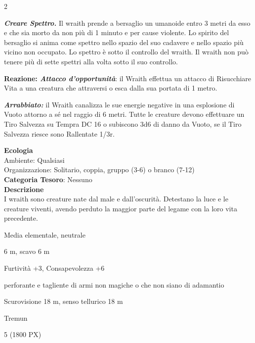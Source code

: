 \begin{multicols}{2}
{\emph{\textbf{Creare Spettro.}} Il wraith prende a bersaglio un umanoide entro 3 metri da esso e che sia morto da non più di 1 minuto e per cause violente. Lo spirito del bersaglio si anima come spettro nello spazio del suo cadavere e nello spazio più vicino non occupato. Lo spettro è sotto il controllo del wraith. Il wraith non può tenere più di sette spettri alla volta sotto il suo controllo.

\textbf{Reazione: \emph{Attacco d'opportunità}}: il Wraith effettua un attacco di Risucchiare Vita a una creatura che attraversi o esca dalla sua portata di 1 metro.

\emph{\textbf{Arrabbiato:}} il Wraith canalizza le sue energie negative in una esplosione di Vuoto attorno a sé nel raggio di 6 metri. Tutte le creature devono effettuare un Tiro Salvezza su Tempra DC 16 o subiscono 3d6 di danno da Vuoto, se il Tiro Salvezza riesce sono Rallentate 1/3r.

\textbf{Ecologia}\\
Ambiente: Qualsiasi\\
Organizzazione: Solitario, coppia, gruppo (3-6) o branco (7-12)\\
\textbf{Categoria Tesoro}: Nessuno\\
\textbf{Descrizione}\\
I wraith sono creature nate dal male e dall'oscurità. Detestano la luce e le creature viventi, avendo perduto la maggior parte del legame con la loro vita precedente.


\begin{description}[noitemsep, topsep=0pt, parsep=0pt, partopsep=0pt, itemsep=1pt, leftmargin=2.35cm,  labelwidth=2.2cm, itemindent=0cm, listparindent=0pt] %
\setlength{\baselineskip}{10pt}
\item[\textbf{Taglia/Tipo}] Media elementale, neutrale
\item[\textbf{Caratt.}] 
\item[\textbf{Punti Ferita}] 
\item[\textbf{Movimento}] 6 m, scavo 6 m
\item[\textbf{Tiri Salvez.}] 
\item[\textbf{Comp.}] Furtività +3, Consapevolezza +6
\item[\textbf{Res. Danni}] perforante e tagliente di armi non magiche o che non siano di adamantio
\item[\textbf{Sensi}] Scurovisione 18 m, senso tellurico 18 m
\item[\textbf{Linguaggi}] Tremun
\item[\textbf{Sfida}] 5 (1800 PX)
\end{description}
\smallskip

}
\end{multicols}
